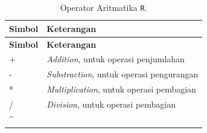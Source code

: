 \documentclass[]{book}
\theoremstyle{definition}
\theoremstyle{definition}
\theoremstyle{definition}
\theoremstyle{remark}
\begin{document}
\begin{longtable}[]{@{}ll@{}}
\caption{\label{tab:oparitmatika} Operator Aritmatika \texttt{R}.}\tabularnewline
\toprule
\begin{minipage}[b]{0.14\columnwidth}\raggedright
\textbf{Simbol}\strut
\end{minipage} & \begin{minipage}[b]{0.80\columnwidth}\raggedright
\textbf{Keterangan}\strut
\end{minipage}\tabularnewline
\midrule
\endfirsthead
\toprule
\begin{minipage}[b]{0.14\columnwidth}\raggedright
\textbf{Simbol}\strut
\end{minipage} & \begin{minipage}[b]{0.80\columnwidth}\raggedright
\textbf{Keterangan}\strut
\end{minipage}\tabularnewline
\midrule
\endhead
\begin{minipage}[t]{0.14\columnwidth}\raggedright
+\strut
\end{minipage} & \begin{minipage}[t]{0.80\columnwidth}\raggedright
\emph{Addition}, untuk operasi penjumlahan\strut
\end{minipage}\tabularnewline
\begin{minipage}[t]{0.14\columnwidth}\raggedright
-\strut
\end{minipage} & \begin{minipage}[t]{0.80\columnwidth}\raggedright
\emph{Substraction}, untuk operasi pengurangan\strut
\end{minipage}\tabularnewline
\begin{minipage}[t]{0.14\columnwidth}\raggedright
*\strut
\end{minipage} & \begin{minipage}[t]{0.80\columnwidth}\raggedright
\emph{Multiplication}, untuk operasi pembagian\strut
\end{minipage}\tabularnewline
\begin{minipage}[t]{0.14\columnwidth}\raggedright
/\strut
\end{minipage} & \begin{minipage}[t]{0.80\columnwidth}\raggedright
\emph{Division}, untuk operasi pembagian\strut
\end{minipage}\tabularnewline
\begin{minipage}[t]{0.14\columnwidth}\raggedright
\^{}\strut
\end{minipage} & \begin{minipage}[t]{0.80\columnwidth}\raggedright

\end{minipage}
\end{longtable}
\end{document}
